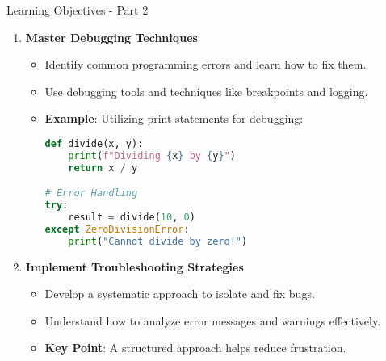 \documentclass[aspectratio=169]{beamer}
\begin{document}
\begin{frame}{Learning Objectives - Part 2}
    \begin{enumerate}[start=2]
        \item \textbf{Master Debugging Techniques}
            \begin{itemize}
                \item Identify common programming errors and learn how to fix them.
                \item Use debugging tools and techniques like breakpoints and logging.
                \item \textbf{Example}: Utilizing print statements for debugging:
                \begin{lstlisting}[language=Python]
def divide(x, y):
    print(f"Dividing {x} by {y}")
    return x / y

# Error Handling
try:
    result = divide(10, 0)
except ZeroDivisionError:
    print("Cannot divide by zero!")
                \end{lstlisting}
            \end{itemize}

        \item \textbf{Implement Troubleshooting Strategies}
            \begin{itemize}
                \item Develop a systematic approach to isolate and fix bugs.
                \item Understand how to analyze error messages and warnings effectively.
                \item \textbf{Key Point}: A structured approach helps reduce frustration.
            \end{itemize}
    \end{enumerate}
\end{frame}
\end{document}
